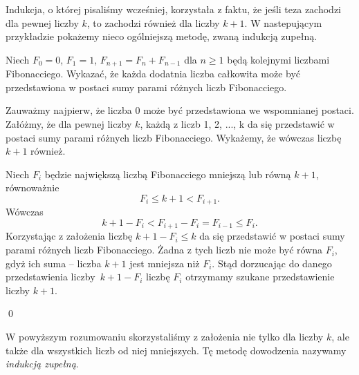 


\noindent
Indukcja, o której pisaliśmy wcześniej, korzystała z faktu, że jeśli teza zachodzi dla pewnej liczby $k$, to zachodzi również dla liczby $k + 1$. W nastepującym przykładzie pokażemy nieco ogólniejszą metodę, zwaną indukcją zupełną.

\vspace{10px}


\noindent
Niech $F_0 = 0$, $F_1 = 1$, $F_{n + 1} = F_n + F_{n - 1}$ dla $n \geqslant 1$ będą kolejnymi liczbami Fibonacciego. Wykazać, że każda dodatnia liczba całkowita może być przedstawiona w postaci sumy parami różnych liczb Fibonacciego.

\vspace{10px}


\noindent
Zauważmy najpierw, że liczba $0$ może być przedstawiona we wspomnianej postaci.
Załóżmy, że dla pewnej liczby $k$, każdą z liczb 1, 2, ..., k da się przedstawić w postaci sumy parami różnych liczb Fibonacciego. Wykażemy, że wówczas liczbę $k + 1$ również.

\vspace{10px}

\noindent
Niech $F_i$ będzie największą liczbą Fibonacciego mniejszą lub równą $k + 1$, równoważnie
\[
	F_i \leqslant k + 1 < F_{i + 1}.
\]
Wówczas
\[
	k + 1 - F_i < F_{i + 1} -  F_{i} = F_{i - 1} \leqslant F_{i}.
\]
Korzystając z założenia liczbę $k + 1 - F_i \leqslant k$ da się przedstawić w postaci sumy parami różnych liczb Fibonacciego. Żadna z tych liczb nie może być równa $F_{i}$, gdyż ich suma -- liczba $k + 1$ jest mniejsza niż $F_i$. Stąd dorzucając do danego przedstawienia liczby~$k + 1 - F_i$  liczbę $F_{i}$ otrzymamy szukane przedstawienie liczby $k + 1$.

\qed

\noindent



\noindent
W powyższym rozumowaniu skorzystaliśmy z założenia nie tylko dla liczby $k$, ale także dla wszystkich liczb od niej mniejszych. Tę metodę dowodzenia  nazywamy \textit{indukcją zupełną}. 

\vspace{10px}

